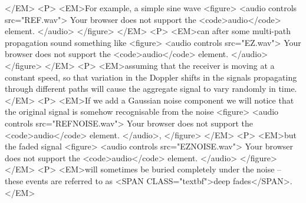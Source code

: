 </EM>
<P>
  <EM>For example, a simple sine wave
    <figure>
      <audio
        controls
        src="REF.wav">
        Your browser does not support the
        <code>audio</code> element.
      </audio>
    </figure>
</EM>
<P>
  <EM>can after some multi-path propagation sound something like
    <figure>
      <audio
        controls
        src="EZ.wav">
        Your browser does not support the
        <code>audio</code> element.
      </audio>
    </figure>
  </EM>
<P>
  <EM>assuming that the receiver is moving at a constant speed, so that variation in the Doppler shifts in the signals propagating through different paths will cause the aggregate signal to vary randomly in time.
  </EM>
<P>
  <EM>If we add a Gaussian noise component we will notice that the original signal is somehow recognisable from the noise
    <figure>
      <audio
        controls
        src="REFNOISE.wav">
        Your browser does not support the
        <code>audio</code> element.
      </audio>,
    </figure>        
</EM>
<P>
  <EM>but the faded signal
    <figure>
      <audio
        controls
        src="EZNOISE.wav">
        Your browser does not support the
        <code>audio</code> element.
      </audio>
    </figure>        
</EM>
<P>
<EM>will sometimes be buried completely under the noise – these events are referred to as <SPAN  CLASS="textbf">deep fades</SPAN>.
</EM>
